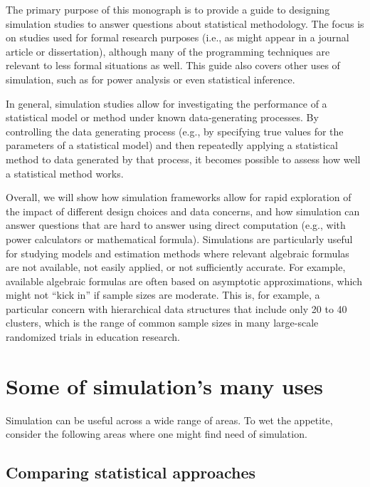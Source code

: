 \documentclass[
]{book}
\begin{document}
The primary purpose of this monograph is to provide a guide to designing simulation studies to answer questions about statistical methodology.
The focus is on studies used for formal research purposes (i.e., as might appear in a journal article or dissertation), although many of the programming techniques are relevant to less formal situations as well.
This guide also covers other uses of simulation, such as for power analysis or even statistical inference.

In general, simulation studies allow for investigating the performance of a statistical model or method under known data-generating processes.
By controlling the data generating process (e.g., by specifying true values for the parameters of a statistical model) and then repeatedly applying a statistical method to data generated by that process, it becomes possible to assess how well a statistical method works.

Overall, we will show how simulation frameworks allow for rapid exploration of the impact of different design choices and data concerns, and how simulation can answer questions that are hard to answer using direct computation (e.g., with power calculators or mathematical formula).
Simulations are particularly useful for studying models and estimation methods where relevant algebraic formulas are not available, not easily applied, or not sufficiently accurate.
For example, available algebraic formulas are often based on asymptotic approximations, which might not ``kick in'' if sample sizes are moderate.
This is, for example, a particular concern with hierarchical data structures that include only 20 to 40 clusters, which is the range of common sample sizes in many large-scale randomized trials in education research.

\hypertarget{some-of-simulations-many-uses}{%
\section{Some of simulation's many uses}\label{some-of-simulations-many-uses}}

Simulation can be useful across a wide range of areas.
To wet the appetite, consider the following areas where one might find need of simulation.

\hypertarget{comparing-statistical-approaches}{%
\subsection{Comparing statistical approaches}\label{comparing-statistical-approaches}}
\end{document}
